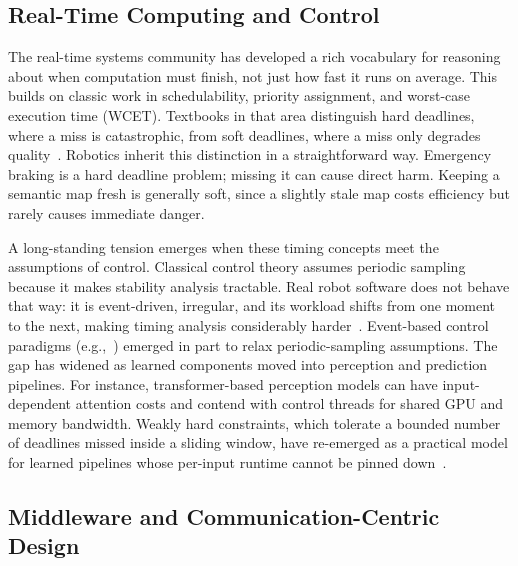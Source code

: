 \documentclass[smallextended]{svjour3}
\begin{document}
\subsection{Real-Time Computing and Control}

The real-time systems community has developed a rich vocabulary for reasoning about when computation must finish, not just how fast it runs on average. This builds on classic work in schedulability, priority assignment, and worst-case execution time (WCET). Textbooks in that area distinguish hard deadlines, where a miss is catastrophic, from soft deadlines, where a miss only degrades quality~\cite{buttazzo2011,liu2000}.
Robotics inherit this distinction in a straightforward way. Emergency braking is a hard deadline problem; missing it can cause direct harm. Keeping a semantic map fresh is generally soft, since a slightly stale map costs efficiency but rarely causes immediate danger.

A long-standing tension emerges when these timing concepts meet the assumptions of control. Classical control theory assumes periodic sampling because it makes stability analysis tractable. Real robot software does not behave that way: it is event-driven, irregular, and its workload shifts from one moment to the next, making timing analysis considerably harder~\cite{buttazzo2011,miskowicz2015}. Event-based control paradigms (e.g.,~\cite{arzen1999}) emerged in part to relax periodic-sampling assumptions. The gap has widened as learned components moved into perception and prediction pipelines. For instance, transformer-based perception models can have input-dependent attention costs and contend with control threads for shared GPU and memory bandwidth.
Weakly hard constraints, which tolerate a bounded number of deadlines missed inside a sliding window, have re-emerged as a practical model for learned pipelines whose per-input runtime cannot be pinned down~\cite{bernat2001}.

\subsection{Middleware and Communication-Centric Design}
\end{document}
